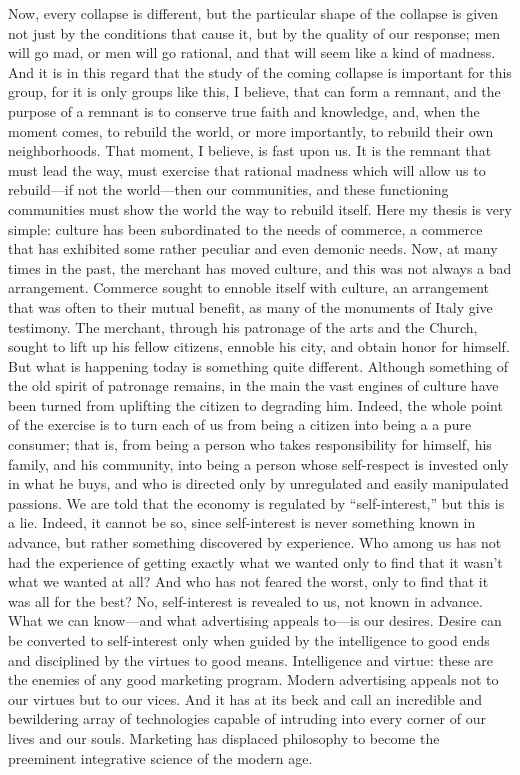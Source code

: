 \begin{quotex}
Now, every collapse is different, but the particular shape of the collapse is given not just by the conditions that cause it, but by the quality of our response; men will go mad, or men will go rational, and that will seem like a kind of madness. And it is in this regard that the study of the coming collapse is important for this group, for it is only groups like this, I believe, that can form a remnant, and the purpose of a remnant is to conserve true faith and knowledge, and, when the moment comes, to rebuild the world, or more importantly, to rebuild their own neighborhoods. That moment, I believe, is fast upon us. It is the remnant that must lead the way, must exercise that rational madness which will allow us to rebuild---if not the world---then our communities, and these functioning communities must show the world the way to rebuild itself. Here my thesis is very simple: culture has been subordinated to the needs of commerce, a commerce that has exhibited some rather peculiar and even demonic needs. Now, at many times in the past, the merchant has moved culture, and this was not always a bad arrangement. Commerce sought to ennoble itself with culture, an arrangement that was often to their mutual benefit, as many of the monuments of Italy give testimony. The merchant, through his patronage of the arts and the Church, sought to lift up his fellow citizens, ennoble his city, and obtain honor for himself. But what is happening today is something quite different. Although something of the old spirit of patronage remains, in the main the vast engines of culture have been turned from uplifting the citizen to degrading him. Indeed, the whole point of the exercise is to turn each of us from being a citizen into being a a pure consumer; that is, from being a person who takes responsibility for himself, his family, and his community, into being a person whose self-respect is invested only in what he buys, and who is directed only by unregulated and easily manipulated passions. We are told that the economy is regulated by ``self-interest,'' but this is a lie. Indeed, it cannot be so, since self-interest is never something known in advance, but rather something discovered by experience. Who among us has not had the experience of getting exactly what we wanted only to find that it wasn't what we wanted at all? And who has not feared the worst, only to find that it was all for the best? No, self-interest is revealed to us, not known in advance. What we can know---and what advertising appeals to---is our desires. Desire can be converted to self-interest only when guided by the intelligence to good ends and disciplined by the virtues to good means. Intelligence and virtue: these are the enemies of any good marketing program. Modern advertising appeals not to our virtues but to our vices. And it has at its beck and call an incredible and bewildering array of technologies capable of intruding into every corner of our lives and our souls. Marketing has displaced philosophy to become the preeminent integrative science of the modern age.
\end{quotex}

